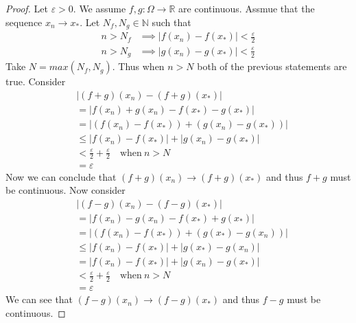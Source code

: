 \documentclass[12pt]{amsart}
\newcommand{\R}{\mathbb{R}}
\newcommand{\N}{\mathbb{N}}
\begin{document}
\begin{proof}
  Let $\varepsilon>0$. We assume $f,g:\Omega\rightarrow\R$ are continuous.
  Assmue that the sequence $x_n\rightarrow x_\ast$. Let $N_f,N_g\in\N$ such
  that
  \begin{align*}
    n>N_f&\implies|f(x_n)-f(x_\ast)|<\frac{\varepsilon}{2}\\
    n>N_g&\implies|g(x_n)-g(x_\ast)|<\frac{\varepsilon}{2}
  \end{align*}
  Take $N=max({N_f,N_g})$. Thus when $n>N$ both of the previous statements are
  true. Consider 
  \begin{align*}
    &|(f+g)(x_n)-(f+g)(x_\ast)|\\
    &=|f(x_n)+g(x_n)-f(x_\ast)-g(x_\ast)|\\
    &=|(f(x_n)-f(x_\ast))+(g(x_n)-g(x_\ast))|\\
    &\leq|f(x_n)-f(x_\ast)|+|g(x_n)-g(x_\ast)|\\
    &<\frac{\varepsilon}{2} + \frac{\varepsilon}{2}\quad \text{when}\ n>N\\
    &=\varepsilon
  \end{align*}
  Now we can conclude that $(f+g)(x_n)\rightarrow(f+g)(x_\ast)$ and thus $f+g$
  must be continuous.
  Now consider
  \begin{align*}
    &|(f-g)(x_n)-(f-g)(x_\ast)|\\
    &=|f(x_n)-g(x_n)-f(x_\ast)+g(x_\ast)|\\
    &=|(f(x_n)-f(x_\ast))+(g(x_\ast)-g(x_n))|\\
    &\leq|f(x_n)-f(x_\ast)|+|g(x_\ast)-g(x_n)|\\
    &=|f(x_n)-f(x_\ast)|+|g(x_n)-g(x_\ast)|\\
    &<\frac{\varepsilon}{2}+\frac{\varepsilon}{2}\quad \text{when}\ n>N\\
    &=\varepsilon
  \end{align*}
  We can see that $(f-g)(x_n)\rightarrow(f-g)(x_\ast)$ and thus $f-g$ must be
  continuous.
\end{proof}

\subsection{}%
\label{sub:1b}
\end{document}

